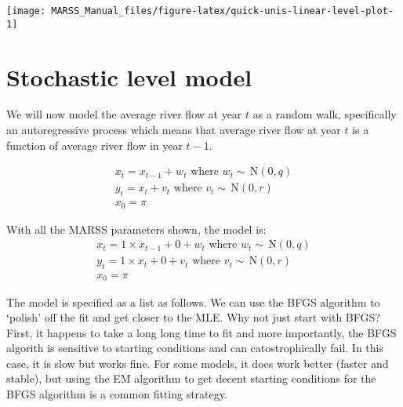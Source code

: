 \documentclass[12pt,]{book}
\begin{document}
\begin{center}\texttt{[image: MARSS\_Manual\_files/figure-latex/quick-unis-linear-level-plot-1]} \end{center}

\hypertarget{stochastic-level-model}{%
\section{Stochastic level model}\label{stochastic-level-model}}

We will now model the average river flow at year \(t\) as a random walk, specifically an autoregressive process which means that average river flow at year \(t\) is a function of average river flow in year \(t-1\).

\begin{equation}
\begin{gathered}
x_t = x_{t-1}+w_t \text{ where } w_t \sim \,\text{N}(0,q) \\
y_t = x_t+v_t \text{ where } v_t \sim \,\text{N}(0,r)  \\
x_0 = \pi 
\end{gathered}   
\label{eq:short-stoch-level-model}
\end{equation}

With all the MARSS parameters shown, the model is:
\begin{equation}
\begin{gathered}
x_t = 1 \times x_{t-1}+ 0 + w_t    \text{ where } w_t \sim \,\text{N}(0,q) \\
y_t = 1 \times x_t + 0 + v_t \text{ where } v_t \sim \,\text{N}(0,r)  \\
x_0 = \pi 
 \end{gathered}   
\label{eq:short-stoch-level-model2}
\end{equation}

The model is specified as a list as follows. We can use the BFGS algorithm to `polish' off the fit and get closer to the MLE. Why not just start with BFGS? First, it happens to take a long long time to fit and more importantly, the BFGS algorith is sensitive to starting conditions and can catostrophically fail. In this case, it is slow but works fine. For some models, it does work better (faster and stable), but using the EM algorithm to get decent starting conditions for the BFGS algorithm is a common fitting strategy.
\end{document}
